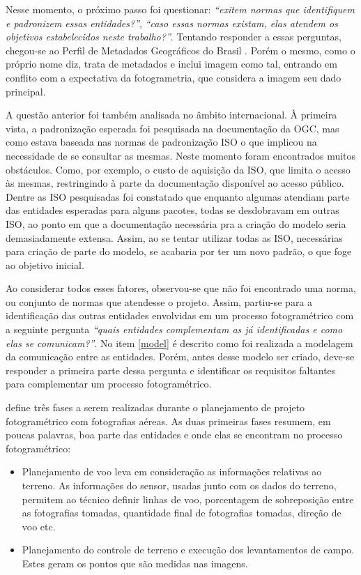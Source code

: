 Nesse momento, o próximo passo foi questionar: \textit{``exitem normas que identifiquem e padronizem essas entidades?''}, \textit{``caso essas normas existam, elas atendem os objetivos estabelecidos neste trabalho?''}. Tentando responder a essas perguntas, chegou-se ao Perfil de Metadados Geográficos do Brasil \cite{pmgb2009}. Porém o mesmo, como o próprio nome diz, trata de metadados e inclui imagem como tal, entrando em conflito com a expectativa da fotogrametria, que considera a imagem seu dado principal.

A questão anterior foi também analisada no âmbito internacional. À primeira vista, a padronização esperada foi pesquisada na documentação da OGC, mas como estava baseada nas normas de padronização ISO o que implicou na necessidade de se consultar as mesmas. Neste momento foram encontrados muitos obstáculos. Como, por exemplo, o custo de aquisição da ISO, que limita o acesso às mesmas, restringindo à parte da documentação disponível ao acesso público. Dentre as ISO pesquisadas foi constatado que enquanto algumas atendiam parte das entidades esperadas para alguns pacotes, todas se desdobravam em outras ISO, ao ponto em que a documentação necessária pra a criação do modelo seria demasiadamente extensa. Assim, ao se tentar utilizar todas as ISO, necessárias para criação de parte do modelo, se acabaria por ter um novo padrão, o que foge ao objetivo inicial.

Ao considerar todos esses fatores, observou-se que não foi encontrado uma norma, ou conjunto de normas que atendesse o projeto. Assim, partiu-se para a identificação das outras entidades envolvidas em um processo fotogramétrico com a seguinte pergunta \textit{``quais entidades complementam as já identificadas e como elas se comunicam?''}. No item \ref{model} é descrito como foi realizada a modelagem da comunicação entre as entidades. Porém, antes desse modelo ser criado, deve-se responder a primeira parte dessa pergunta e identificar os requisitos faltantes para complementar um processo fotogramétrico.  

 define três fases a serem realizadas durante o planejamento de projeto fotogramétrico com fotografias aéreas. As duas primeiras fases resumem, em poucas palavras, boa parte das entidades e onde elas se encontram no processo fotogramétrico:

 \begin{itemize}
     \item Planejamento de voo leva em consideração as informações relativas ao terreno. As informações do sensor, usadas junto com os dados do terreno, permitem ao técnico definir linhas de voo, porcentagem de sobreposição entre as fotografias tomadas, quantidade final de fotografias tomadas, direção de voo etc.
     \item Planejamento do controle de terreno e execução dos levantamentos de campo. Estes geram os pontos que são medidas nas imagens.
 \end{itemize}

